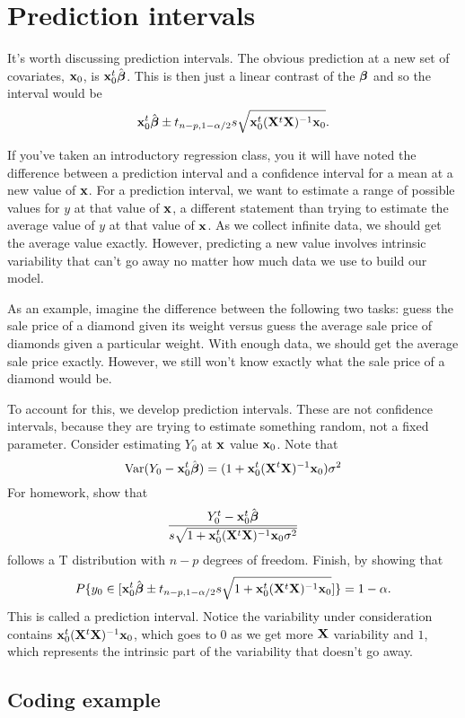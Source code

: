 \section{Prediction intervals}

It's worth discussing prediction intervals. The obvious prediction
at a new set of covariates, $\mathbf{x}_0$, is $\mathbf{x}_0^t \hat {\boldsymbol{\beta}}$. This is 
then just a linear contrast of the $\boldsymbol{\beta}$ and so the interval would be
$$
\mathbf{x}_0^t \hat {\boldsymbol{\beta}}
\pm t_{n-p, 1-\alpha/2} s \sqrt{\mathbf{x}_0^t (\mathbf{X}^t \mathbf{X})^{-1} \mathbf{x}_0}.
$$

If you've taken an introductory regression class, you it will have noted
the difference between a prediction interval and a confidence interval
for a mean at a new value of $\mathbf{x}$. For a prediction interval, we
want to estimate a range of possible values for $y$ at that value
of $\mathbf{x}$, a different statement than trying to estimate the average
value of $y$ at that value of $\mathbf{x}$. As we collect infinite data,
we should get the average value exactly. However, predicting a new
value involves intrinsic variability that can't go away no matter
how much data we use to build our model. 

As an example, imagine the difference between the following two tasks:
guess the sale price of a diamond given its weight
versus guess the average sale price of diamonds 
given a particular weight. With enough data, we should get the average
sale price exactly. However, we still won't know exactly what the sale
price of a diamond would be. 

To account for this, we develop prediction intervals. These
are not confidence intervals, because they are trying to estimate
something random, not a fixed parameter. 
Consider estimating $Y_0$ at $\mathbf{x}$ value $\mathbf{x}_0$. 
Note that
$$
\mbox{Var}(Y_0 - \mathbf{x}_0^t \hat {\boldsymbol{\beta}}) = (1 + \mathbf{x}_0^t (\mathbf{X}^t \mathbf{X})^{-1} \mathbf{x}_0)\sigma^2
$$
For homework,
show that 
$$
\frac{Y_0^t - \mathbf{x}_0^t \hat {\boldsymbol{\beta}}}{s\sqrt{1 + \mathbf{x}_0^t (\mathbf{X}^t \mathbf{X})^{-1} \mathbf{x}_0 \sigma^2}}
$$
follows a T distribution with $n-p$ degrees of freedom. Finish, by showing that
$$
P\{y_0 \in [\mathbf{x}_0^t \hat {\boldsymbol{\beta}}
\pm t_{n-p, 1-\alpha/2} s \sqrt{1 + \mathbf{x}_0^t (\mathbf{X}^t \mathbf{X})^{-1} \mathbf{x}_0}]\} = 1 - \alpha.
$$
This is called a prediction interval. Notice the variability under consideration
contains $\mathbf{x}_0^t (\mathbf{X}^t \mathbf{X})^{-1} \mathbf{x}_0$, which goes to 0 as we get more $\mathbf{X}$ variability
and $1$, which represents the intrinsic part of the variability that doesn't
go away.


\subsection{Coding example}


